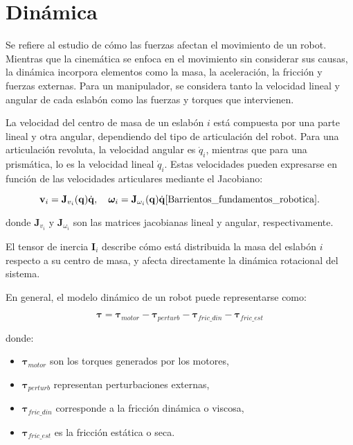 \section{Dinámica} \label{sec:dinamica}

Se refiere al estudio de cómo las fuerzas afectan el movimiento de un robot. Mientras que la cinemática se enfoca en el movimiento sin considerar sus causas, la dinámica incorpora elementos como la masa, la aceleración, la fricción y fuerzas externas. Para un manipulador, se considera tanto la velocidad lineal y angular de cada eslabón como las fuerzas y torques que intervienen\cite{Barrientos_fundamentos_robotica}.

La velocidad del centro de masa de un eslabón \(i\) está compuesta por una parte lineal y otra angular, dependiendo del tipo de articulación del robot. Para una articulación revoluta, la velocidad angular es \(\dot{q}_i\), mientras que para una prismática, lo es la velocidad lineal \(\dot{q}_i\). Estas velocidades pueden expresarse en función de las velocidades articulares mediante el Jacobiano:

\begin{equation}
	\mathbf{v}_i = \mathbf{J}_{v_i}(\mathbf{q}) \dot{\mathbf{q}}, \quad
	\boldsymbol{\omega}_i = \mathbf{J}_{\omega_i}(\mathbf{q}) \dot{\mathbf{q}} \text{\cite{Barrientos_fundamentos_robotica}}.
\end{equation}


donde \(\mathbf{J}_{v_i}\) y \(\mathbf{J}_{\omega_i}\) son las matrices jacobianas lineal y angular, respectivamente.

El tensor de inercia \(\mathbf{I}_i\) describe cómo está distribuida la masa del eslabón \(i\) respecto a su centro de masa, y afecta directamente la dinámica rotacional del sistema.

En general, el modelo dinámico de un robot puede representarse como:

\begin{equation}
	\boldsymbol{\tau} = \boldsymbol{\tau}_{motor} - \boldsymbol{\tau}_{perturb} - \boldsymbol{\tau}_{fric\_din} - \boldsymbol{\tau}_{fric\_est}
\end{equation}

donde:
\begin{itemize}
	\item \(\boldsymbol{\tau}_{motor}\) son los torques generados por los motores,
	\item \(\boldsymbol{\tau}_{perturb}\) representan perturbaciones externas,
	\item \(\boldsymbol{\tau}_{fric\_din}\) corresponde a la fricción dinámica o viscosa,
	\item \(\boldsymbol{\tau}_{fric\_est}\) es la fricción estática o seca.
\end{itemize}

